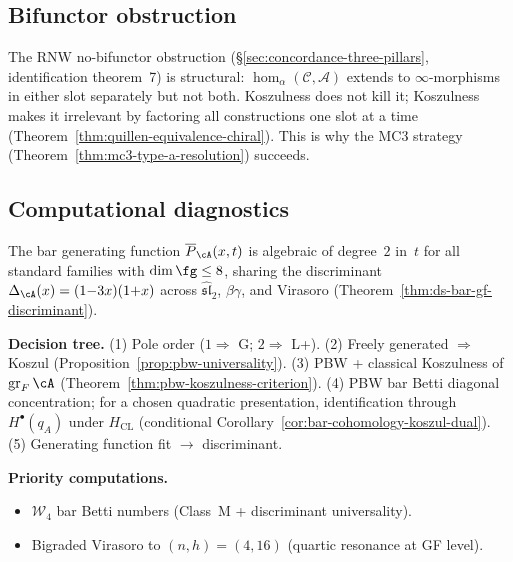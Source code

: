 \subsection{Bifunctor obstruction}
\label{subsec:concordance-bifunctor-obstruction}

The RNW no-bifunctor obstruction \cite{RNW19}
(\S\ref{sec:concordance-three-pillars}, identification
theorem~7) is structural: $\operatorname{hom}_\alpha(
\mathcal{C},\mathcal{A})$ extends to $\infty$-morphisms in
either slot separately but not both. Koszulness does not kill
it; Koszulness makes it irrelevant by factoring all
constructions one slot at a time
(Theorem~\ref{thm:quillen-equivalence-chiral}). This is why
the MC3 strategy
(Theorem~\ref{thm:mc3-type-a-resolution}) succeeds.
\label{rem:concordance-bifunctor-koszul}


\subsection{Computational diagnostics}
\label{subsec:concordance-computational-diagnostics}

The bar generating function $\overline{P}_\cA(x,t)$ is
algebraic of degree~$2$ in~$t$ for all standard families with
$\dim\fg \le 8$, sharing the discriminant
$\Delta_\cA(x) = (1{-}3x)(1{+}x)$
across $\widehat{\mathfrak{sl}}_2$, $\beta\gamma$, and
Virasoro (Theorem~\ref{thm:ds-bar-gf-discriminant}).

\smallskip\noindent\textbf{Decision tree.}\enspace
(1) Pole order ($1 \Rightarrow$ G; $2 \Rightarrow$ L+).
(2) Freely generated $\Rightarrow$ Koszul (Proposition~\ref{prop:pbw-universality}).
(3) PBW + classical Koszulness of $\operatorname{gr}_F\cA$ (Theorem~\ref{thm:pbw-koszulness-criterion}).
(4) PBW bar Betti diagonal concentration; for a chosen quadratic
presentation, identification through $H^\bullet(q_A)$ under
$H_{\mathrm{CL}}$
(conditional Corollary~\ref{cor:bar-cohomology-koszul-dual}).
(5) Generating function fit $\to$ discriminant.

\smallskip\noindent\textbf{Priority computations.}
\begin{itemize}[nosep]
\item $\mathcal{W}_4$ bar Betti numbers (Class~M + discriminant universality).
\item Bigraded Virasoro to $(n,h)=(4,16)$ (quartic resonance at GF level).
\end{itemize}

